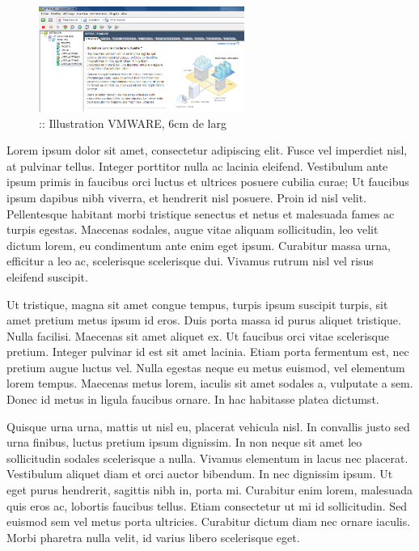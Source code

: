 \documentclass[a4paper,12pt]{report}
\begin{document}
\begin{figure}[H]
  \centering
  \includegraphics[width=0.6\textwidth]{image/images/ConfigVMWARE}
  \caption{:: Illustration VMWARE, 6cm de larg}
\end{figure}

Lorem ipsum dolor sit amet, consectetur adipiscing elit. Fusce vel imperdiet nisl, at pulvinar tellus. Integer porttitor nulla ac lacinia eleifend. Vestibulum ante ipsum primis in faucibus orci luctus et ultrices posuere cubilia curae; Ut faucibus ipsum dapibus nibh viverra, et hendrerit nisl posuere. Proin id nisl velit. Pellentesque habitant morbi tristique senectus et netus et malesuada fames ac turpis egestas. Maecenas sodales, augue vitae aliquam sollicitudin, leo velit dictum lorem, eu condimentum ante enim eget ipsum. Curabitur massa urna, efficitur a leo ac, scelerisque scelerisque dui. Vivamus rutrum nisl vel risus eleifend suscipit.

Ut tristique, magna sit amet congue tempus, turpis ipsum suscipit turpis, sit amet pretium metus ipsum id eros. Duis porta massa id purus aliquet tristique. Nulla facilisi. Maecenas sit amet aliquet ex. Ut faucibus orci vitae scelerisque pretium. Integer pulvinar id est sit amet lacinia. Etiam porta fermentum est, nec pretium augue luctus vel. Nulla egestas neque eu metus euismod, vel elementum lorem tempus. Maecenas metus lorem, iaculis sit amet sodales a, vulputate a sem. Donec id metus in ligula faucibus ornare. In hac habitasse platea dictumst.

Quisque urna urna, mattis ut nisl eu, placerat vehicula nisl. In convallis justo sed urna finibus, luctus pretium ipsum dignissim. In non neque sit amet leo sollicitudin sodales scelerisque a nulla. Vivamus elementum in lacus nec placerat. Vestibulum aliquet diam et orci auctor bibendum. In nec dignissim ipsum. Ut eget purus hendrerit, sagittis nibh in, porta mi. Curabitur enim lorem, malesuada quis eros ac, lobortis faucibus tellus. Etiam consectetur ut mi id sollicitudin. Sed euismod sem vel metus porta ultricies. Curabitur dictum diam nec ornare iaculis. Morbi pharetra nulla velit, id varius libero scelerisque eget.
\end{document}
